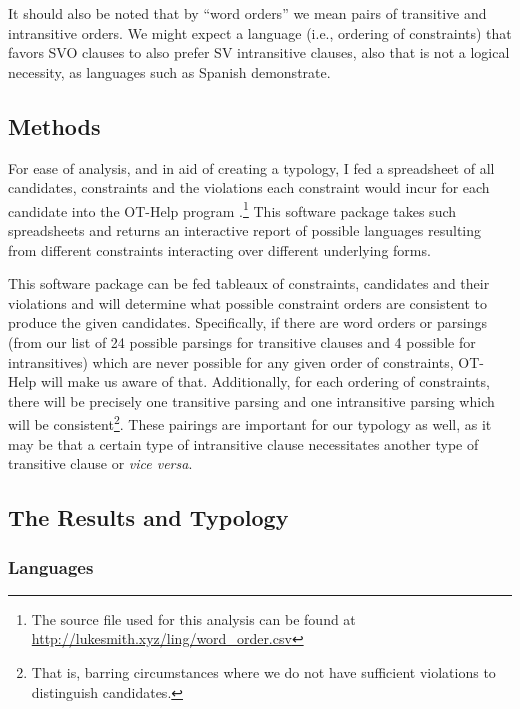 \documentclass{article}
\begin{document}
It should also be noted that by ``word orders'' we mean pairs of transitive and intransitive orders.
We might expect a language (i.e., ordering of constraints) that favors SVO clauses to also prefer SV intransitive clauses, also that is not a logical necessity, as languages such as Spanish demonstrate.

\subsection{Methods}

For ease of analysis, and in aid of creating a typology, I fed a spreadsheet of all candidates, constraints and the violations each constraint would incur for each candidate into the OT-Help program \parencite{othelp}.\footnote{The source file used for this analysis can be found at \href{http://lukesmith.xyz/ling/word_order.csv}{http://lukesmith.xyz/ling/word\_order.csv}} This software package takes such spreadsheets and returns an interactive report of possible languages resulting from different constraints interacting over different underlying forms.

This software package can be fed tableaux of constraints, candidates and their violations and will determine what possible constraint orders are consistent to produce the given candidates.
Specifically, if there are word orders or parsings (from our list of 24 possible parsings for transitive clauses and 4 possible for intransitives) which are never possible for any given order of constraints, OT-Help will make us aware of that.
Additionally, for each ordering of constraints, there will be precisely one transitive parsing and one intransitive parsing which will be consistent\footnote{That is, barring circumstances where we do not have sufficient violations to distinguish candidates.}.
These pairings are important for our typology as well, as it may be that a certain type of intransitive clause necessitates another type of transitive clause or \textit{vice versa}.

\subsection{The Results and Typology}

\subsubsection{Languages}

\newcommand{\no}{\textcolor{gray}}
\end{document}
